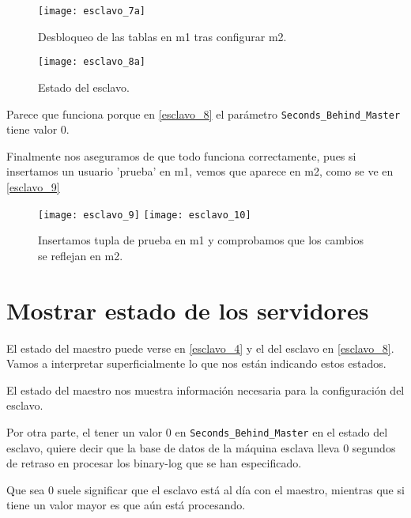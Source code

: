 \begin{figure}[h!]
\begin{center}
\caption{Desbloqueo de las tablas en m1 tras configurar m2.}
\label{esclavo_6}
\texttt{[image: esclavo\_7a]}
\end{center}
\end{figure}

\begin{figure}[h!]
\begin{center}
\caption{Estado del esclavo.}
\label{esclavo_8}
\texttt{[image: esclavo\_8a]}
\end{center}
\end{figure}

Parece que funciona porque en \eqref{esclavo_8} el parámetro \verb|Seconds_Behind_Master| tiene valor 0.

Finalmente nos aseguramos de que todo funciona correctamente, pues si insertamos un usuario 'prueba' en m1, vemos que aparece en m2, como se ve en \eqref{esclavo_9}

\begin{figure}[h!]
\begin{center}
\caption{Insertamos tupla de prueba en m1 y comprobamos que los cambios se reflejan en m2.}
\label{esclavo_9}
\texttt{[image: esclavo\_9]}
\texttt{[image: esclavo\_10]}
\end{center}
\end{figure}



\chapter{Mostrar estado de los servidores}

El estado del maestro puede verse en \eqref{esclavo_4} y el del esclavo en \eqref{esclavo_8}. Vamos a interpretar superficialmente lo que nos están indicando estos estados.

El estado del maestro nos muestra información necesaria para la configuración del esclavo.

Por otra parte, el tener un valor $0$ en \verb|Seconds_Behind_Master| en el estado del esclavo, quiere decir que la base de datos de la máquina esclava lleva 0 segundos de retraso en procesar los binary-log que se han especificado.

Que sea 0 suele significar que el esclavo está al día con el maestro, mientras que si tiene un valor mayor es que aún está procesando.


